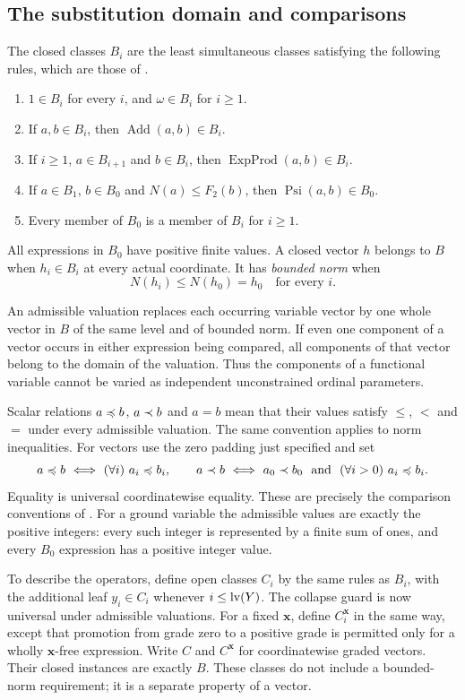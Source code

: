 \subsection{The substitution domain and comparisons}

The closed classes $B_i$ are the least simultaneous classes satisfying
the following rules, which are those of \cite[Definition~2.6]{ww}.
\begin{enumerate}[label=(\roman*)]
\item $1\in B_i$ for every $i$, and $\omega\in B_i$ for $i\ge1$.
\item If $a,b\in B_i$, then $\operatorname{Add}(a,b)\in B_i$.
\item If $i\ge1$, $a\in B_{i+1}$ and $b\in B_i$, then
$\operatorname{ExpProd}(a,b)\in B_i$.
\item If $a\in B_1$, $b\in B_0$ and $N(a)\le F_2(b)$, then
$\operatorname{Psi}(a,b)\in B_0$.
\item Every member of $B_0$ is a member of $B_i$ for $i\ge1$.
\end{enumerate}
All expressions in $B_0$ have positive finite values.  A closed vector
$h$ belongs to $B$ when $h_i\in B_i$ at every actual coordinate.
It has \emph{bounded norm} when
\[
 N(h_i)\le N(h_0)=h_0\quad\text{for every }i.
\]

An admissible valuation replaces each occurring variable vector by one
whole vector in $B$ of the same level and of bounded norm.  If even one
component of a vector occurs in either expression being compared, all
components of that vector belong to the domain of the valuation.
Thus the components of a functional variable cannot be varied as
independent unconstrained ordinal parameters.

Scalar relations $a\preccurlyeq b$, $a\prec b$ and $a=b$ mean that their
values satisfy $\le$, $<$ and $=$ under every admissible valuation.
The same convention applies to norm inequalities.  For vectors use
the zero padding just specified and set
\[
 a\mle b\ \Longleftrightarrow\ (\forall i)\ a_i\mle b_i,
 \qquad
 a\mslt b\ \Longleftrightarrow\
 a_0\mslt b_0\ \text{ and }\ (\forall i>0)\ a_i\mle b_i.
\]
Equality is universal coordinatewise equality.  These are precisely the
comparison conventions of \cite[Definitions~2.7--2.8]{ww}.
For a ground variable the admissible values are exactly the positive
integers: every such integer is represented by a finite sum of ones,
and every $B_0$ expression has a positive integer value.

To describe the operators, define open classes $C_i$ by the same rules
as $B_i$, with the additional leaf $y_i\in C_i$ whenever
$i\le\operatorname{lv}(Y)$.  The collapse guard is now universal under admissible
valuations.  For a fixed $\mathbf x$, define $C_i^{\mathbf x}$ in
the same way, except that promotion from grade zero to a positive
grade is permitted only for a wholly $\mathbf x$-free expression.
Write $C$ and $C^{\mathbf x}$ for coordinatewise graded vectors.
Their closed instances are exactly $B$.  These classes do not include
a bounded-norm requirement; it is a separate property of a vector.


